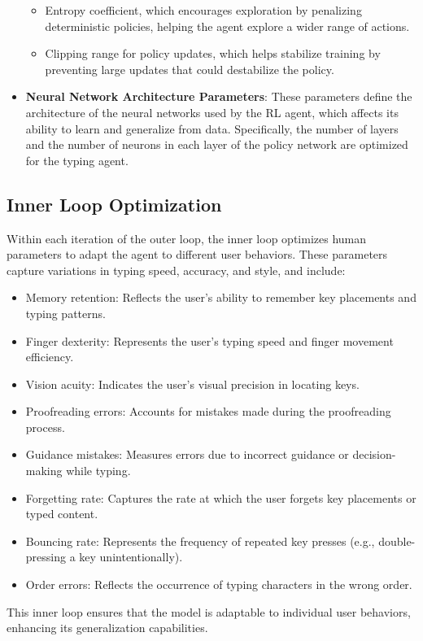 \begin{itemize}
\begin{itemize}
            \item Entropy coefficient, which encourages exploration by penalizing deterministic policies, helping the agent explore a wider range of actions.
            \item Clipping range for policy updates, which helps stabilize training by preventing large updates that could destabilize the policy.
        \end{itemize}
        \item \textbf{Neural Network Architecture Parameters}: These parameters define the architecture of the neural networks used by the RL agent, which affects its ability to learn and generalize from data. Specifically, the number of layers and the number of neurons in each layer of the policy network are optimized for the typing agent.
    \end{itemize}

\subsection{Inner Loop Optimization}
Within each iteration of the outer loop, the inner loop optimizes human parameters to adapt the agent to different user behaviors. These parameters capture variations in typing speed, accuracy, and style, and include:
    \begin{itemize}
        \item Memory retention: Reflects the user's ability to remember key placements and typing patterns.
        \item Finger dexterity: Represents the user's typing speed and finger movement efficiency.
        \item Vision acuity: Indicates the user's visual precision in locating keys.
        \item Proofreading errors: Accounts for mistakes made during the proofreading process.
        \item Guidance mistakes: Measures errors due to incorrect guidance or decision-making while typing.
        \item Forgetting rate: Captures the rate at which the user forgets key placements or typed content. 
        \item Bouncing rate: Represents the frequency of repeated key presses (e.g., double-pressing a key unintentionally).
        \item Order errors: Reflects the occurrence of typing characters in the wrong order.
    \end{itemize}
This inner loop ensures that the model is adaptable to individual user behaviors, enhancing its generalization capabilities.

